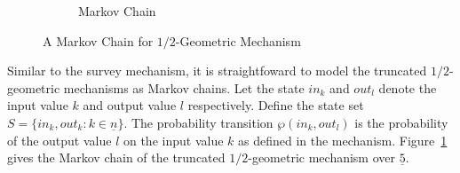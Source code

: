 \begin{figure}
\begin{subfigure}{.50\columnwidth}
{
    }
    \caption{Markov Chain}
    \label{figure:geometric-mechanism-markov-chain}
  \end{subfigure}
  
  \caption{A Markov Chain for $1/2$-Geometric Mechanism}
  \label{figure:geometric-mechanism}
\end{figure}

Similar to the survey mechanism, it is 
straightfoward to model the truncated $1/2$-geometric
mechanisms as Markov chains. Let the state $in_k$ and $out_l$
denote the input value $k$ and output value $l$ respectively. Define
the state set $S = \{ in_k, out_k : k \in \underline{n} \}$.  
The probability transition $\wp (in_k, out_l)$ is the probability of the
output value $l$ on the input value $k$ as defined in the
mechanism. Figure~\ref{figure:geometric-mechanism-markov-chain} gives 
the Markov chain of the truncated
$1/2$-geometric mechanism over $\underline{5}$.


